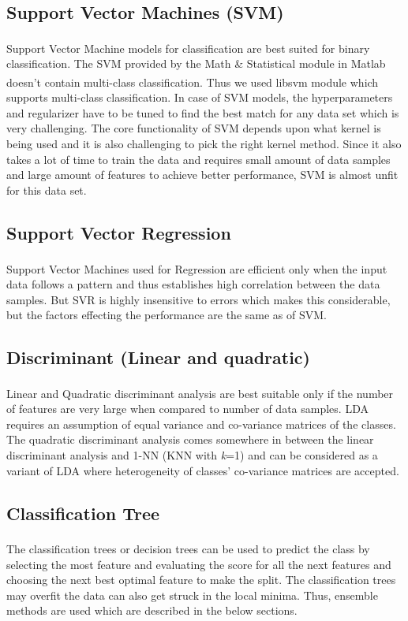 \documentclass[journal, a4paper]{IEEEtran}
\begin{document}
\subsection{Support Vector Machines (SVM)}
Support Vector Machine models\textsuperscript{\cite{SVM}} for classification are best suited for binary classification. The SVM provided by the Math \& Statistical module in Matlab doesn't contain multi-class classification. Thus we used libsvm module\textsuperscript{\cite{libSVM}} which supports multi-class classification. In case of SVM models, the hyperparameters and regularizer have to be tuned to find the best match for any data set which is very challenging. The core functionality of SVM depends upon what kernel is being used and it is also challenging to pick the right kernel method. Since it also takes a lot of time to train the data and requires small amount of data samples and large amount of features to achieve better performance, SVM is almost unfit for this data set.
\subsection{Support Vector Regression}
Support Vector Machines\textsuperscript{\cite{SVR}} used for Regression are efficient only when the input data follows a pattern and thus establishes high correlation between the data samples. But SVR is highly insensitive to errors which makes this considerable, but the factors effecting the performance are the same as of SVM.
\subsection{Discriminant (Linear and quadratic)}
Linear and Quadratic discriminant analysis\textsuperscript{\cite{lda}} are best suitable only if the number of features are very large when compared to number of data samples. LDA requires an assumption of equal variance and co-variance matrices of the classes. The quadratic discriminant analysis comes somewhere in between the linear discriminant analysis and 1-NN (KNN with \textit{k}=1) and can be considered as a variant of LDA where heterogeneity of classes' co-variance matrices are accepted.
\subsection{Classification Tree}
The classification trees\textsuperscript{\cite{ctree}} or decision trees can be used to predict the class by selecting the most feature and evaluating the score for all the next features and choosing the next best optimal feature to make the split. The classification trees may overfit the data can also get struck in the local minima. Thus, ensemble methods are used which are described in the below sections.
\end{document}
